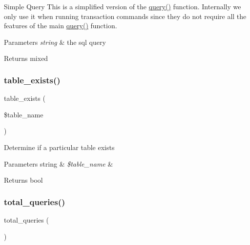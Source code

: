 Simple Query This is a simplified version of the \mbox{\hyperlink{class_c_i___d_b__driver_a4711d63638a755f763352472063f0bbf}{query()}} function. Internally we only use it when running transaction commands since they do not require all the features of the main \mbox{\hyperlink{class_c_i___d_b__driver_a4711d63638a755f763352472063f0bbf}{query()}} function.


\begin{DoxyParams}{Parameters}
{\em string} & the sql query \\
\hline
\end{DoxyParams}
\begin{DoxyReturn}{Returns}
mixed 
\end{DoxyReturn}
\mbox{\label{class_c_i___d_b__driver_af148cb2cd5d490d2a480c0c741ceed03}} 
\subsubsection{\texorpdfstring{table\+\_\+exists()}{table\_exists()}}
{\footnotesize\ttfamily table\+\_\+exists (\begin{DoxyParamCaption}\item[{}]{\$table\+\_\+name }\end{DoxyParamCaption})}

Determine if a particular table exists


\begin{DoxyParams}[1]{Parameters}
string & {\em \$table\+\_\+name} & \\
\hline
\end{DoxyParams}
\begin{DoxyReturn}{Returns}
bool 
\end{DoxyReturn}
\mbox{\label{class_c_i___d_b__driver_a8fc0b6551e1ca0c68c6e3a66b27310fc}} 
\subsubsection{\texorpdfstring{total\+\_\+queries()}{total\_queries()}}
{\footnotesize\ttfamily total\+\_\+queries (\begin{DoxyParamCaption}{ }\end{DoxyParamCaption})}

